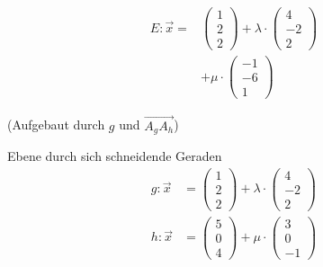 \documentclass[paper=a6,landscape,ngerman,twoside=true,fontsize=12pt]{scrartcl}
\begin{document}
\begin{antwort}
	
	\begin{align*}
	E:\vec{x}=&\left(\begin{array}{c} 1 \\ 2 \\ 2\end{array} \right)+\lambda \cdot \left(\begin{array}{c} 4 \\ -2 \\ 2\end{array} \right)\\
	&+\mu \cdot \left(\begin{array}{c} -1 \\-6 \\ 1\end{array} \right)
	\end{align*}
	\begin{center}
	(Aufgebaut durch $g$ und $\vec{A_gA_h}$)
	\end{center}
	
\end{antwort}	
\begin{frage}
	\LARGE
	Ebene durch sich schneidende Geraden
	\large
	\begin{align*}
	g:\vec{x}&=\left(\begin{array}{c} 1 \\ 2 \\ 2\end{array} \right)+\lambda \cdot \left(\begin{array}{c} 4 \\ -2 \\ 2\end{array} \right)\\
	h:\vec{x}&=\left(\begin{array}{c} 5 \\ 0 \\ 4\end{array} \right)+\mu \cdot \left(\begin{array}{c} 3 \\ 0 \\ -1\end{array} \right)
	\end{align*}
\end{frage}
\end{document}
